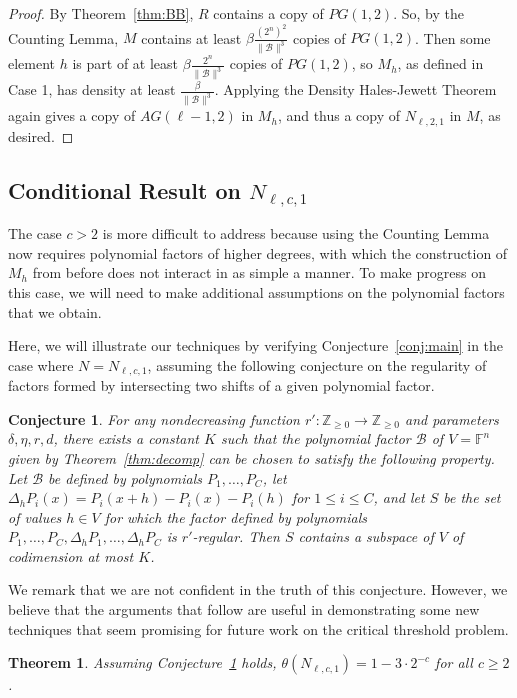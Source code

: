 \documentclass{article}
\theoremstyle{plain}
\newtheorem{thm}[theorem]{Theorem}
\newtheorem{conj}[theorem]{Conjecture}
\theoremstyle{definition}
\theoremstyle{definition}
\theoremstyle{remark}
\numberwithin{equation}{section}
\newcommand{\FF}{\mathbb{F}}
\newcommand{\ZZ}{\mathbb{Z}}
\newcommand{\cB}{\mathcal B}
\begin{document}
\begin{proof}
By Theorem~\ref{thm:BB}, $R$ contains a copy of $PG(1,2)$. So, by the Counting Lemma, $M$ contains at least $\beta \frac{(2^{n})^{2}}{\|\cB\|^{3}}$ copies of $PG(1,2)$. Then some element $h$ is part of at least $\beta \frac{2^{n}}{\|\cB\|^{3}}$ copies of $PG(1,2)$, so $M_h$, as defined in Case 1, has density at least $\frac{\beta}{\|\cB\|^{3}}$. Applying the Density Hales-Jewett Theorem again gives a copy of $AG(\ell-1,2)$ in $M_h$, and thus a copy of $N_{\ell,2,1}$ in $M$, as desired.
\end{proof}

\subsection{Conditional Result on \texorpdfstring{$N_{\ell,c,1}$}{N\_(l,c,1)}}

The case $c>2$ is more difficult to address because using the Counting Lemma now requires polynomial factors of higher degrees, with which the construction of $M_h$ from before does not interact in as simple a manner. To make progress on this case, we will need to make additional assumptions on the polynomial factors that we obtain.

Here, we will illustrate our techniques by verifying Conjecture~\ref{conj:main} in the case where $N=N_{\ell,c,1}$, assuming the following conjecture on the regularity of factors formed by intersecting two shifts of a given polynomial factor.

\begin{conj}
\label{conj:polydifreg}
For any nondecreasing function $r':\ZZ_{\geq 0}\to \ZZ_{\geq 0}$ and parameters $\delta,\eta,r,d$, there exists a constant $K$ such that the polynomial factor $\cB$ of $V=\FF^n$ given by Theorem~\ref{thm:decomp} can be chosen to satisfy the following property. Let $\cB$ be defined by polynomials $P_1,\dots,P_C$, let $\Delta_h P_i(x)=P_i(x+h)-P_i(x)-P_i(h)$ for $1\leq i\leq C$, and let $S$ be the set of values $h\in V$ for which the factor defined by polynomials $P_1,\dots,P_C,\Delta_h P_1, \dots, \Delta_h P_C$ is $r'$-regular. Then $S$ contains a subspace of $V$ of codimension at most $K$.
\end{conj}

We remark that we are not confident in the truth of this conjecture. However, we believe that the arguments that follow are useful in demonstrating some new techniques that seem promising for future work on the critical threshold problem.

\begin{thm}
\label{thm:conditional}
Assuming Conjecture~\ref{conj:polydifreg} holds, $\theta(N_{\ell,c,1})=1-3\cdot 2^{-c}$ for all $c\geq 2$.
\end{thm}
\end{document}
